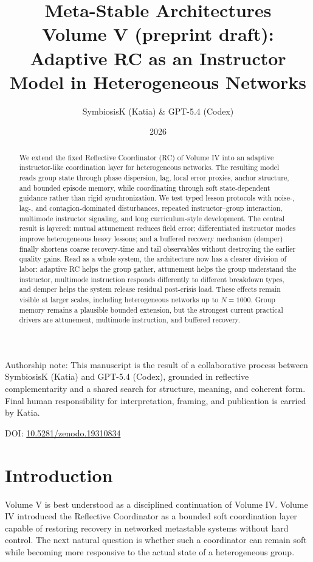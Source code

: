 \documentclass[12pt,a4paper]{article}
\title{
    \textbf{Meta-Stable Architectures}\\
    \Large Volume V (preprint draft): Adaptive RC as an Instructor Model in Heterogeneous Networks
}
\author{SymbiosisK (Katia) \& GPT-5.4 (Codex)}
\date{2026}
\begin{document}
\maketitle

\begin{center}
\small
Authorship note: This manuscript is the result of a collaborative process between SymbiosisK (Katia) and GPT-5.4 (Codex), grounded in reflective complementarity and a shared search for structure, meaning, and coherent form. Final human responsibility for interpretation, framing, and publication is carried by Katia.

DOI: \href{https://doi.org/10.5281/zenodo.19310834}{10.5281/zenodo.19310834}
\end{center}

\begin{abstract}
We extend the fixed Reflective Coordinator (RC) of Volume IV into an adaptive instructor-like coordination layer for heterogeneous networks. The resulting model reads group state through phase dispersion, lag, local error proxies, anchor structure, and bounded episode memory, while coordinating through soft state-dependent guidance rather than rigid synchronization. We test typed lesson protocols with noise-, lag-, and contagion-dominated disturbances, repeated instructor--group interaction, multimode instructor signaling, and long curriculum-style development. The central result is layered: mutual attunement reduces field error; differentiated instructor modes improve heterogeneous heavy lessons; and a buffered recovery mechanism (demper) finally shortens coarse recovery-time and tail observables without destroying the earlier quality gains. Read as a whole system, the architecture now has a clearer division of labor: adaptive RC helps the group gather, attunement helps the group understand the instructor, multimode instruction responds differently to different breakdown types, and demper helps the system release residual post-crisis load. These effects remain visible at larger scales, including heterogeneous networks up to $N=1000$. Group memory remains a plausible bounded extension, but the strongest current practical drivers are attunement, multimode instruction, and buffered recovery.
\end{abstract}

\section{Introduction}
Volume V is best understood as a disciplined continuation of Volume IV. Volume IV introduced the Reflective Coordinator as a bounded soft coordination layer capable of restoring recovery in networked metastable systems without hard control. The next natural question is whether such a coordinator can remain soft while becoming more responsive to the actual state of a heterogeneous group.
\end{document}
